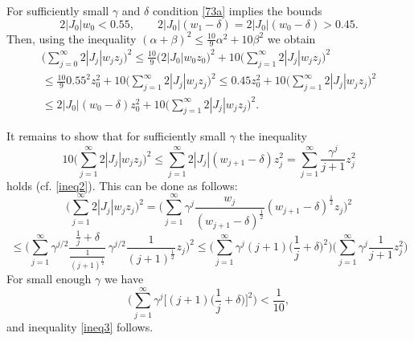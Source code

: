 \documentclass[11pt]{article}
\theoremstyle{remark}
\begin{document}
For sufficiently small $\gamma$
and $\delta$ condition \eqref{73a} implies the bounds
$$
2|J_0|w_0<0.55,\qquad 2|J_0|(w_1-\delta)=2|J_0|(w_0-\delta)>0.45.
$$
Then, using the inequality $(\alpha+\beta)^2\leqslant \frac{10}9\alpha^2+10\beta^2$ we obtain
\begin{equation*}
	\begin{gathered}
		\Big(\sum_{j=0}^{\infty}2|J_j|w_j z_j\Big)^2 \leqslant \frac{10}{9}\big(2|J_0|w_0z_0\big)^2+10\Big(\sum_{j=1}^{\infty}2|J_j|w_j z_j\Big)^2
		\\
		\leqslant
		\frac{10}9 0.55^2z_0^2+10\Big(\sum_{j=1}^{\infty}2|J_j|w_j z_j\Big)^2
		\leqslant
		0.45z_0^2+10\Big(\sum_{j=1}^{\infty}2|J_j|w_j z_j\Big)^2
		\\
		\leqslant
		2|J_0|(w_0-\delta)z_0^2+10\Big(\sum_{j=1}^{\infty}2|J_j|w_j z_j\Big)^2.
	\end{gathered}
\end{equation*}


It remains to show that for sufficiently small $\gamma$  the inequality
\begin{equation}\label{ineq3}
	10\Big(\sum_{j=1}^{\infty}2|J_j|w_j z_j\Big)^2\leqslant  \sum_{j=1}^{\infty}2 |J_j|(w_{j+1}-\delta)  z_j^2 = \sum_{j=1}^{\infty}\frac{\gamma^j}{j+1}z_j^2
\end{equation}
holds (cf. \eqref{ineq2}). This can be done as follows:
$$
\Big(\sum_{j=1}^{\infty}2|J_j|w_j z_j\Big)^2=\Big(\sum_{j=1}^{\infty}\gamma^j\frac{w_j}{(w_{j+1}-\delta)^\frac12}
(w_{j+1}-\delta)^\frac12 z_j \Big)^2
$$
$$
\leqslant \Big(\sum_{j=1}^{\infty}\gamma^{j/2}\frac{\frac1j+\delta}{\frac1{(j+1)^\frac12}}
\,\gamma^{j/2}\frac1{(j+1)^\frac12} z_j \Big)^2\leqslant
\Big(\sum_{j=1}^{\infty}\gamma^{j}(j+1)\big(\frac1j+\delta\big)^2\Big)
\Big(\sum_{j=1}^{\infty}\gamma^{j}\frac1{j+1}z_j^2\Big)
$$
For small enough $\gamma$  we have
$$
\Big(\sum_{j=1}^{\infty}\gamma^{j}\big[(j+1)\big(\frac1j+\delta\big)\big]^2\Big)<\frac1{10},
$$
and inequality \eqref{ineq3} follows.
\end{document}
